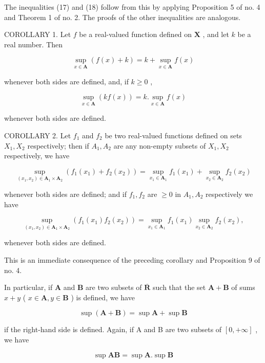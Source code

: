 The inequalities (17) and (18) follow from this by applying Proposition 5 of no. 4 and Theorem 1 of no. 2. The proofs of the other inequalities are analogous.

COROLLARY 1. Let \(f\) be a real-valued function defined on \(\mathbf{X}\) , and let \(k\) be a real number. Then

\[
\sup _ {x \in \mathbf {A}} (f (x) + k) = k + \sup _ {x \in \mathbf {A}} f (x)\tag{22}
\]

whenever both sides are defined, and, if \(k \geqslant 0\) ,

\[
\sup _ {x \in \mathbf {A}} (k f (x)) = k. \sup _ {x \in \mathbf {A}} f (x)\tag{23}
\]

whenever both sides are defined.

COROLLARY 2. Let \(f_{1}\) and \(f_{2}\) be two real-valued functions defined on sets \(X_{1}, X_{2}\) respectively; then if \(A_{1}, A_{2}\) are any non-empty subsets of \(X_{1}, X_{2}\) respectively, we have

\[
\sup _ {(x _ {1}, x _ {2}) \in \mathbf {A} _ {1} \times \mathbf {A} _ {2}} (f _ {1} (x _ {1}) + f _ {2} (x _ {2})) = \sup _ {x _ {1} \in \mathbf {A} _ {1}} f _ {1} (x _ {1}) + \sup _ {x _ {2} \in \mathbf {A} _ {2}} f _ {2} (x _ {2})\tag{24}
\]

whenever both sides are defined; and if \(f_1, f_2\) are \(\geqslant 0\) in \(A_1, A_2\) respectively we have

\[
\sup _ {(x _ {1}, x _ {2}) \in \mathbf {A} _ {1} \times \mathbf {A} _ {2}} (f _ {1} (x _ {1}) f _ {2} (x _ {2})) = \sup _ {x _ {1} \in \mathbf {A} _ {1}} f _ {1} (x _ {1}) \sup _ {x _ {2} \in \mathbf {A} _ {2}} f _ {2} (x _ {2}),\tag{25}
\]

whenever both sides are defined.

This is an immediate consequence of the preceding corollary and Proposition 9 of no. 4.

In particular, if \(\mathbf{A}\) and \(\mathbf{B}\) are two subsets of \(\overline{\mathbf{R}}\) such that the set \(\mathbf{A} + \mathbf{B}\) of sums \(x + y\) ( \(x \in \mathbf{A}, y \in \mathbf{B}\) ) is defined, we have

\[
\sup (\mathbf {A} + \mathbf {B}) = \sup \mathbf {A} + \sup \mathbf {B}\tag{26}
\]

if the right-hand side is defined. Again, if A and B are two subsets of \([0, +\infty]\) , we have

\[
\sup \mathbf {A B} = \sup \mathbf {A}. \sup \mathbf {B}\tag{27}
\]

